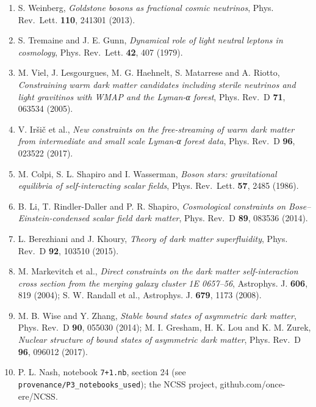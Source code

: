 \documentclass[
  10pt,
]{article}
\begin{document}
\begin{enumerate}
{  interacting dark radiation, and the Hubble tension in light of ACT DR6
  data}, Phys. Rev.~D (accepted 13 October 2026), doi:10.1103/c68x-58mj.
\item
  S. Weinberg, \emph{Goldstone bosons as fractional cosmic neutrinos},
  Phys. Rev.~Lett. \textbf{110}, 241301 (2013).
\item
  S. Tremaine and J. E. Gunn, \emph{Dynamical role of light neutral
  leptons in cosmology}, Phys. Rev.~Lett. \textbf{42}, 407 (1979).
\item
  M. Viel, J. Lesgourgues, M. G. Haehnelt, S. Matarrese and A. Riotto,
  \emph{Constraining warm dark matter candidates including sterile
  neutrinos and light gravitinos with WMAP and the Lyman-α forest},
  Phys. Rev.~D \textbf{71}, 063534 (2005).
\item
  V. Iršič et al., \emph{New constraints on the free-streaming of warm
  dark matter from intermediate and small scale Lyman-α forest data},
  Phys. Rev.~D \textbf{96}, 023522 (2017).
\item
  M. Colpi, S. L. Shapiro and I. Wasserman, \emph{Boson stars:
  gravitational equilibria of self-interacting scalar fields}, Phys.
  Rev.~Lett. \textbf{57}, 2485 (1986).
\item
  B. Li, T. Rindler-Daller and P. R. Shapiro, \emph{Cosmological
  constraints on Bose--Einstein-condensed scalar field dark matter},
  Phys. Rev.~D \textbf{89}, 083536 (2014).
\item
  L. Berezhiani and J. Khoury, \emph{Theory of dark matter
  superfluidity}, Phys. Rev.~D \textbf{92}, 103510 (2015).
\item
  M. Markevitch et al., \emph{Direct constraints on the dark matter
  self-interaction cross section from the merging galaxy cluster 1E
  0657--56}, Astrophys. J. \textbf{606}, 819 (2004); S. W. Randall et
  al., Astrophys. J. \textbf{679}, 1173 (2008).
\item
  M. B. Wise and Y. Zhang, \emph{Stable bound states of asymmetric dark
  matter}, Phys. Rev.~D \textbf{90}, 055030 (2014); M. I. Gresham, H. K.
  Lou and K. M. Zurek, \emph{Nuclear structure of bound states of
  asymmetric dark matter}, Phys. Rev.~D \textbf{96}, 096012 (2017).
\item
  P. L. Nash, notebook \texttt{7+1.nb}, section 24 (see
  \texttt{provenance/P3\_notebooks\_used}); the NCSS project,
  github.com/once-ere/NCSS.
\end{enumerate}
\end{document}
